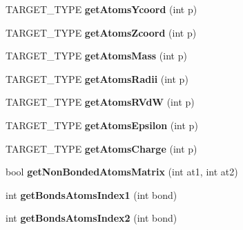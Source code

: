 \begin{DoxyCompactItemize}
\item 
T\+A\+R\+G\+E\+T\+\_\+\+T\+Y\+PE {\bfseries get\+Atoms\+Ycoord} (int p)\hypertarget{classreadAmberInput_a2f7bd84dfdfce9c419d443b0b0796a33}{}\label{classreadAmberInput_a2f7bd84dfdfce9c419d443b0b0796a33}

\item 
T\+A\+R\+G\+E\+T\+\_\+\+T\+Y\+PE {\bfseries get\+Atoms\+Zcoord} (int p)\hypertarget{classreadAmberInput_aba1ed33217d18f3bf7df292df5941e11}{}\label{classreadAmberInput_aba1ed33217d18f3bf7df292df5941e11}

\item 
T\+A\+R\+G\+E\+T\+\_\+\+T\+Y\+PE {\bfseries get\+Atoms\+Mass} (int p)\hypertarget{classreadAmberInput_ad124d3f6ff1919be96e09179fb97bad9}{}\label{classreadAmberInput_ad124d3f6ff1919be96e09179fb97bad9}

\item 
T\+A\+R\+G\+E\+T\+\_\+\+T\+Y\+PE {\bfseries get\+Atoms\+Radii} (int p)\hypertarget{classreadAmberInput_ae2125d3679c4a385072a056584edfde7}{}\label{classreadAmberInput_ae2125d3679c4a385072a056584edfde7}

\item 
T\+A\+R\+G\+E\+T\+\_\+\+T\+Y\+PE {\bfseries get\+Atoms\+R\+VdW} (int p)\hypertarget{classreadAmberInput_a2080064a2806b17c737e8c8334beb918}{}\label{classreadAmberInput_a2080064a2806b17c737e8c8334beb918}

\item 
T\+A\+R\+G\+E\+T\+\_\+\+T\+Y\+PE {\bfseries get\+Atoms\+Epsilon} (int p)\hypertarget{classreadAmberInput_ab50ffd9dd523e10dbbad92a028498142}{}\label{classreadAmberInput_ab50ffd9dd523e10dbbad92a028498142}

\item 
T\+A\+R\+G\+E\+T\+\_\+\+T\+Y\+PE {\bfseries get\+Atoms\+Charge} (int p)\hypertarget{classreadAmberInput_abda9d4525de7f41ad001b1b8da398a17}{}\label{classreadAmberInput_abda9d4525de7f41ad001b1b8da398a17}

\item 
bool {\bfseries get\+Non\+Bonded\+Atoms\+Matrix} (int at1, int at2)\hypertarget{classreadAmberInput_a6c40081a166f09d75b6ba423354c3d1e}{}\label{classreadAmberInput_a6c40081a166f09d75b6ba423354c3d1e}

\item 
int {\bfseries get\+Bonds\+Atoms\+Index1} (int bond)\hypertarget{classreadAmberInput_acf8975d56b34343eeb5dd2f82be01044}{}\label{classreadAmberInput_acf8975d56b34343eeb5dd2f82be01044}

\item 
int {\bfseries get\+Bonds\+Atoms\+Index2} (int bond)\hypertarget{classreadAmberInput_a14d6aa21bc9b39f991462a325cc72b08}{}\label{classreadAmberInput_a14d6aa21bc9b39f991462a325cc72b08}


\end{DoxyCompactItemize}
